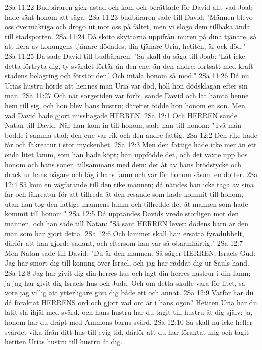 2Sa 11:22  Budbäraren gick åstad och kom och berättade för David allt vad Joab hade sänt honom att säga;
2Sa 11:23  budbäraren sade till David: "Männen blevo oss övermäktiga och drogo ut mot oss på fältet, men vi slogo dem tillbaka ända till stadsporten.
2Sa 11:24  Då sköto skyttarna uppifrån muren på dina tjänare, så att flera av konungens tjänare dödades; din tjänare Uria, hetiten, är ock död."
2Sa 11:25  Då sade David till budbäraren: "Så skall du säga till Joab: 'Låt icke detta förtryta dig, ty svärdet förtär än den ene, än den andre; fortsatt med kraft stadens belägring och förstör den.' Och intala honom så mod."
2Sa 11:26  Då nu Urias hustru hörde att hennes man Uria var död, höll hon dödsklagan efter sin man.
2Sa 11:27  Och när sorgetiden var förbi, sände David och lät hämta henne hem till sig, och hon blev hans hustru; därefter födde hon honom en son. Men vad David hade gjort misshagade HERREN.
2Sa 12:1  Och HERREN sände Natan till David. När han kom in till honom, sade han till honom: "Två män bodde i samma stad; den ene var rik och den andre fattig.
2Sa 12:2  Den rike hade får och fäkreatur i stor myckenhet.
2Sa 12:3  Men den fattige hade icke mer än ett enda litet lamm, som han hade köpt; han uppfödde det, och det växte upp hos honom och hans söner, tillsammans med dem: det åt av hans brödstycke och drack ur hans bägare och låg i hans famn och var för honom såsom en dotter.
2Sa 12:4  Så kom en vägfarande till den rike mannen; då nändes han icke taga av sina får och fäkreatur för att tillreda åt den resande som hade kommit till honom, utan han tog den fattige mannens lamm och tillredde det åt mannen som hade kommit till honom."
2Sa 12:5  Då upptändes Davids vrede storligen mot den mannen, och han sade till Natan: "Så sant HERREN lever: dödens barn är den man som har gjort detta.
2Sa 12:6  Och lammet skall han ersätta fyradubbelt, därför att han gjorde sådant, och eftersom han var så obarmhärtig."
2Sa 12:7  Men Natan sade till David: "Du är den mannen. Så säger HERREN, Israels Gud: Jag har smort dig till konung över Israel, och jag har räddat dig ur Sauls hand.
2Sa 12:8  Jag har givit dig din herres hus och lagt din herres hustrur i din famn; ja jag har givit dig Israels hus och Juda. Och om detta skulle vara för litet, så vore jag villig att ytterligare giva dig både ett och annat.
2Sa 12:9  Varför har du då föraktat HERRENS ord och gjort vad ont är i hans ögon? Hetiten Uria har du låtit slå ihjäl med svärd, och hans hustru har du tagit till hustru åt dig själv; ja, honom har du dräpt med Ammons barns svärd.
2Sa 12:10  Så skall nu icke heller svärdet vika ifrån ditt hus till evig tid, därför att du har föraktat mig och tagit hetiten Urias hustru till hustru åt dig.
